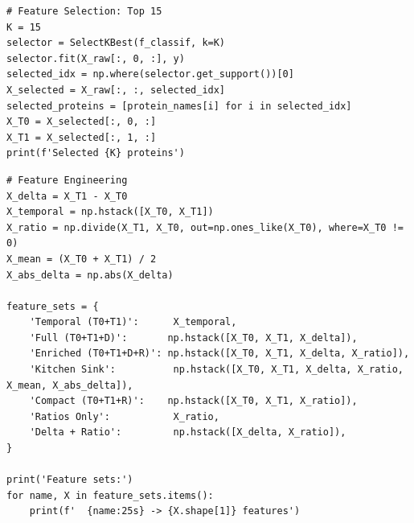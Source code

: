 \begin{lstlisting}
# Feature Selection: Top 15
K = 15
selector = SelectKBest(f_classif, k=K)
selector.fit(X_raw[:, 0, :], y)
selected_idx = np.where(selector.get_support())[0]
X_selected = X_raw[:, :, selected_idx]
selected_proteins = [protein_names[i] for i in selected_idx]
X_T0 = X_selected[:, 0, :]
X_T1 = X_selected[:, 1, :]
print(f'Selected {K} proteins')
\end{lstlisting}
 
\begin{lstlisting}
# Feature Engineering
X_delta = X_T1 - X_T0
X_temporal = np.hstack([X_T0, X_T1])
X_ratio = np.divide(X_T1, X_T0, out=np.ones_like(X_T0), where=X_T0 != 0)
X_mean = (X_T0 + X_T1) / 2
X_abs_delta = np.abs(X_delta)
 
feature_sets = {
    'Temporal (T0+T1)':      X_temporal,
    'Full (T0+T1+D)':       np.hstack([X_T0, X_T1, X_delta]),
    'Enriched (T0+T1+D+R)': np.hstack([X_T0, X_T1, X_delta, X_ratio]),
    'Kitchen Sink':          np.hstack([X_T0, X_T1, X_delta, X_ratio, X_mean, X_abs_delta]),
    'Compact (T0+T1+R)':    np.hstack([X_T0, X_T1, X_ratio]),
    'Ratios Only':           X_ratio,
    'Delta + Ratio':         np.hstack([X_delta, X_ratio]),
}
 
print('Feature sets:')
for name, X in feature_sets.items():
    print(f'  {name:25s} -> {X.shape[1]} features')
\end{lstlisting}
 
